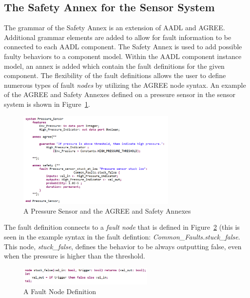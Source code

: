 \subsection{The Safety Annex for the Sensor System}
The grammar of the Safety Annex is an extension of AADL and AGREE. Additional grammar elements are added to allow for fault information to be connected to each AADL component. The Safety Annex is used to add possible faulty behaviors to a component model. Within the AADL component instance model, an annex is added which contain the fault definitions for the given component. The flexibility of the fault definitions allows the user to define numerous types of fault \textit{nodes} by utilizing the AGREE node syntax. An example of the AGREE and Safety Annexes defined on a pressure sensor in the sensor system is shown in Figure~\ref{fig:annexes}. 
\begin{figure}[h]
	\centering
	\includegraphics[width=0.7\textwidth]{images/sensorAnnexes.PNG}
	\caption{A Pressure Sensor and the AGREE and Safety Annexes}
	\label{fig:annexes}
\end{figure}
The fault definition connects to a \textit{fault node} that is defined in Figure~\ref{fig:node} (this is seen in the example syntax in the fault defintion: \textit{Common\_Faults.stuck\_false}. This node, \textit{stuck\_false}, defines the behavior to be always outputting false, even when the pressure is higher than the threshold.
\begin{figure}[h]
	\centering
	\includegraphics[width=0.6\textwidth]{images/sensorNode.PNG}
	\caption{A Fault Node Definition}
	\label{fig:node}
\end{figure}

